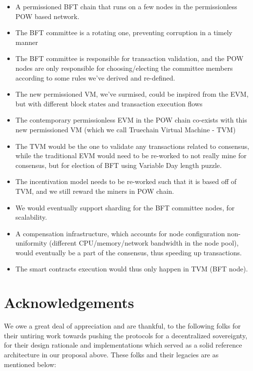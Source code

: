 \documentclass[9pt,oneside]{amsart}
\begin{document}
\begin{multicols}{2}
\begin{itemize}
  \item A permissioned BFT chain that runs on a few nodes in the permissionless POW based network.
  \item The BFT committee is a rotating one, preventing corruption in a timely manner
  \item The BFT committee is responsible for transaction validation, and the POW nodes are only responsible for choosing/electing the committee members according to some rules we've derived and re-defined.
  \item The new permissioned VM, we've surmised, could be inspired from the EVM, but with different block states and transaction execution flows
  \item The contemporary permissionless EVM in the POW chain co-exists with this new permissioned VM (which we call Truechain Virtual Machine - TVM)
  \item The TVM would be the one to validate any transactions related to consensus, while the traditional EVM would need to be re-worked to not really mine for consensus, but for election of BFT using Variable Day length puzzle.
  \item The incentivation model needs to be re-worked such that it is based off of TVM, and we still reward the miners in POW chain.
  \item We would eventually support sharding for the BFT committee nodes, for scalability.
  \item A compensation infrastructure, which accounts for node configuration non-uniformity (different CPU/memory/network bandwidth in the node pool), would eventually be a part of the consensus, thus speeding up transactions.
  \item The smart contracts execution would thus only happen in TVM (BFT node).
\end{itemize}


\section{Acknowledgements}

We owe a great deal of appreciation and are thankful, to the following folks for their untiring work towards pushing the protocols
for a decentralized sovereignty, for their design rationale and implementations which served as a solid reference architecture
in our proposal above. These folks and their legacies are as mentioned below:


\end{multicols}
\end{document}
